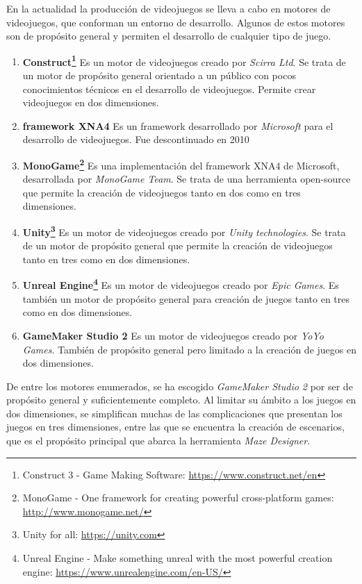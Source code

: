 En la actualidad la producción de videojuegos se lleva a cabo en motores de videojuegos, que conforman un entorno de desarrollo. Algunos de estos motores son de propósito general y permiten el desarrollo de cualquier tipo de juego.
\begin{enumerate}
	\item \textbf{Construct\footnote{Construct 3 - Game Making Software: \url{https://www.construct.net/en}}} Es un motor de videojuegos creado por \textit{Scirra Ltd}. Se trata de un motor de propósito general orientado a un público con pocos conocimientos técnicos en el desarrollo de videojuegos. Permite crear videojuegos en dos dimensiones.
	\item \textbf{framework XNA4\cite{xna4}} Es un framework desarrollado por \textit{Microsoft} para el desarrollo de videojuegos. Fue descontinuado en 2010
	\item \textbf{MonoGame\footnote{MonoGame - One framework for creating powerful cross-platform games: \url{http://www.monogame.net/}}} Es una implementación del framework XNA4 de Microsoft, desarrollada por \textit{MonoGame Team}. Se trata de una herramienta open-source que permite la creación de videojuegos tanto en dos como en tres dimensiones.
	\item \textbf{Unity\footnote{Unity for all: \url{https://unity.com}}} Es un motor de videojuegos creado por \textit{Unity technologies}. Se trata de un motor de propósito general que permite la creación de videojuegos tanto en tres como en dos dimensiones.
	\item \textbf{Unreal Engine\footnote{Unreal Engine - Make something unreal with the most powerful creation engine: \url{https://www.unrealengine.com/en-US/}}} Es un motor de videojuegos creado por \textit{Epic Games}. Es también un motor de propósito general para creación de juegos tanto en tres como en dos dimensiones.
	\item \textbf{GameMaker Studio 2\cite{gamemaker}} Es un motor de videojuegos creado por \textit{YoYo Games}. También de propósito general pero limitado a la creación de juegos en dos dimensiones.
\end{enumerate}

De entre los motores enumerados, se ha escogido \textit{GameMaker Studio 2} por ser de propósito general y suficientemente completo.
Al limitar su ámbito a los juegos en dos dimensiones, se simplifican muchas de las complicaciones que presentan los juegos en tres dimensiones, entre las que se encuentra la creación de escenarios, que es el propósito principal que abarca la herramienta \textit{Maze Designer}.